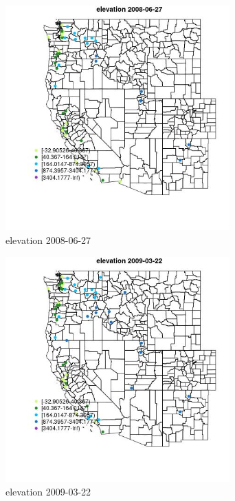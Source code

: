\begin{figure} 
\centering  
\includegraphics[width=0.77\textwidth]{Code_Outputs/Report_ML_input_PM25_Step4_part_e_de_duplicated_aves_MapObselevation2008-06-27.jpg} 
\caption{\label{fig:Report_ML_input_PM25_Step4_part_e_de_duplicated_avesMapObselevation2008-06-27}elevation 2008-06-27} 
\end{figure} 
 

\begin{figure} 
\centering  
\includegraphics[width=0.77\textwidth]{Code_Outputs/Report_ML_input_PM25_Step4_part_e_de_duplicated_aves_MapObselevation2009-03-22.jpg} 
\caption{\label{fig:Report_ML_input_PM25_Step4_part_e_de_duplicated_avesMapObselevation2009-03-22}elevation 2009-03-22} 
\end{figure} 
 

